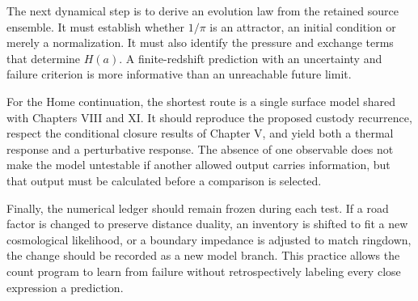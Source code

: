 The next dynamical step is to derive an evolution law from the retained source ensemble. It must establish whether $1/\pi$ is an attractor, an initial condition or merely a normalization. It must also identify the pressure and exchange terms that determine $H(a)$. A finite-redshift prediction with an uncertainty and failure criterion is more informative than an unreachable future limit.

For the Home continuation, the shortest route is a single surface model shared with Chapters VIII and XI. It should reproduce the proposed custody recurrence, respect the conditional closure results of Chapter V, and yield both a thermal response and a perturbative response. The absence of one observable does not make the model untestable if another allowed output carries information, but that output must be calculated before a comparison is selected.

Finally, the numerical ledger should remain frozen during each test. If a road factor is changed to preserve distance duality, an inventory is shifted to fit a new cosmological likelihood, or a boundary impedance is adjusted to match ringdown, the change should be recorded as a new model branch. This practice allows the count program to learn from failure without retrospectively labeling every close expression a prediction.
